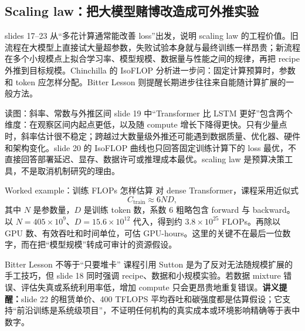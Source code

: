 \subsection{Scaling law：把大模型赌博改造成可外推实验}

slides 17--23 从“多花计算通常能改善 loss”出发，说明 scaling law 的工程价值。旧流程在大模型上直接试大量超参数，失败试验本身就与最终训练一样昂贵；新流程在多个小规模点上拟合学习率、模型规模、数据量与性能之间的规律，再把 recipe 外推到目标规模。Chinchilla 的 IsoFLOP 分析进一步问：固定计算预算时，参数和 token 应怎样分配。Bitter Lesson 则提醒长期进步往往来自能随计算扩展的一般方法。


\begin{knowledgebox}{读图：斜率、常数与外推区间}
slide 19 中“Transformer 比 LSTM 更好”包含两个维度：在观察区间内起点更低，以及随 compute 增长下降得更快。只有少量点时，斜率估计很不稳定；跨越过大数量级外推还可能遇到数据质量、优化器、硬件和架构变化。slide 20 的 IsoFLOP 曲线也只回答固定训练计算下的 loss 最优，不直接回答部署延迟、显存、数据许可或推理成本最优。scaling law 是预算决策工具，不是取消机制研究的理由。
\end{knowledgebox}

\begin{importantbox}{Worked example：训练 FLOPs 怎样估算}
对 dense Transformer，课程采用近似式
\[
C_{\mathrm{train}}\approx 6ND,
\]
其中 $N$ 是参数量，$D$ 是训练 token 数，系数 6 粗略包含 forward 与 backward。以 $N=405\times10^9$、$D=15.6\times10^{12}$ 代入，得到约 $3.8\times10^{25}$ FLOPs。再除以 GPU 数、有效吞吐和时间单位，可估 GPU-hours。这里的关键不在最后一位数字，而在把“模型规模”转成可审计的资源假设。
\end{importantbox}

\begin{warningbox}{Bitter Lesson 不等于“只要堆卡”}
课程引用 Sutton 是为了反对无法随规模扩展的手工技巧，但 slide 18 同时强调 recipe、数据和小规模实验。若数据 mixture 错误、评估失真或系统利用率低，增加 compute 只会更昂贵地重复错误。\textbf{讲义提醒：}slide 22 的租赁单价、400 TFLOPS 平均吞吐和碳强度都是估算假设；它支持“前沿训练是系统级项目”，不证明任何机构的真实成本或环境影响精确等于表中数字。
\end{warningbox}

